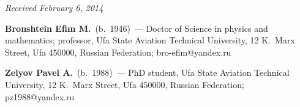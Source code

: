 \hfill{\small\textit{Received February 6, 2014}}

\vspace*{-18pt}

\Contr

\noindent
\textbf{Bronshtein Efim M.}\ (b.\ 1946)~--- Doctor of Science in physics and mathematics; professor,
Ufa State Aviation Technical University, 12 K.~Marx Street, Ufa 450000, Russian Federation; bro-efim@yandex.ru

\vspace*{3pt}

\noindent
\textbf{Zelyov Pavel A.}\ (b.\ 1988)~---
PhD student,  Ufa State Aviation Technical University, 12 K.~Marx Street, Ufa 450000, Russian Federation;
pz1988@yandex.ru
\label{end\stat}

\renewcommand{\bibname}{\protect\rm Литература}
		
